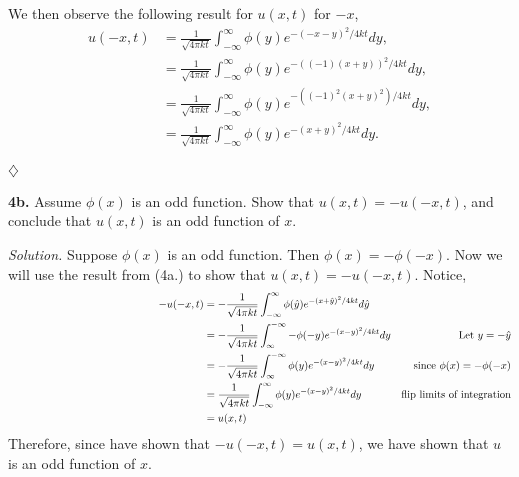 \documentclass{article}
\begin{document}
We then observe the following result for \(u(x,t)\) for \(-x\), 
\begin{align*}
u(-x,t) &= \frac{1}{ \sqrt{4\pi kt} } \int_{-\infty}^{\infty} \phi(y) e^{-(-x-y)^2 /4kt } dy, \\
&= \frac{1}{ \sqrt{4\pi kt} } \int_{-\infty}^{\infty} \phi(y) e^{-((-1)(x+y))^2 /4kt } dy, \\
&=\frac{1}{ \sqrt{4\pi kt} } \int_{-\infty}^{\infty} \phi(y) e^{-((-1)^2(x+y)^2) /4kt } dy, \\
&= \frac{1}{ \sqrt{4\pi kt} } \int_{-\infty}^{\infty} \phi(y) e^{-(x+y)^2 /4kt } dy.
\end{align*}
\begin{flushright}
\(\diamondsuit\)
\end{flushright}






\vspace{5mm}
\textbf{4b.} Assume \(\phi(x) \) is an odd function. Show that \(u(x,t) = -u(-x,t)\), and conclude that \(u(x,t)\) is an odd function of \(x\). 


\vspace{3mm}
\textit{Solution.} Suppose \(\phi(x)\) is an odd function. Then \(\phi(x)=-\phi(-x)\). Now we will use the result from (4a.) to show that \(u(x,t) = -u(-x,t)\). Notice, 
\begin{align*}
-u(-x,t) &= -\frac{1}{ \sqrt{4\pi kt} } \int_{-\infty}^{\infty} \phi(\hat y) e^{-(x+\hat y)^2 /4kt } d\hat y  && \\
&= -\frac{1}{ \sqrt{4\pi kt} } \int_{\infty}^{-\infty} -\phi(-y) e^{-(x-y)^2 /4kt } dy &\text{Let } y=-\hat y &\\
&=  -\frac{1}{ \sqrt{4\pi kt} } \int_{\infty}^{-\infty} \phi(y) e^{-(x-y)^2 /4kt } dy &\text{since } \phi(x)=-\phi(-x)\\
&=  \frac{1}{ \sqrt{4\pi kt} } \int_{-\infty}^{\infty} \phi(y) e^{-(x-y)^2 /4kt } dy &\text{flip limits of integration}\\
\hspace{65mm} &= u(x,t)
\end{align*}
Therefore, since have shown that \(-u(-x,t) = u(x,t)\), we have shown that \(u \) is an odd function of \(x\). 
\end{document}
